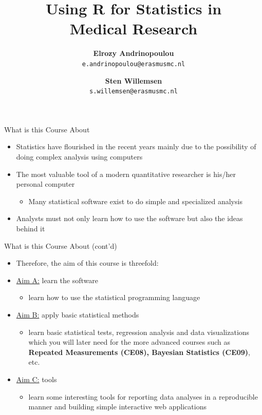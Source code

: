 \documentclass[14pt, aspectratio=169, sectionpage=simple, xclolor=table]{beamer}
\title{Using R for Statistics in \\ Medical Research}
\author{{\large \textbf{Elrozy Andrinopoulou}}\\
	\small{\texttt{e.andrinopoulou@erasmusmc.nl}} \vspace*{1ex} \\
	\and 
{\large 	\textbf{Sten Willemsen}}\\
	\small{\texttt{s.willemsen@erasmusmc.nl}}}
\institute{Department of Biostatistics, Erasmus University Medical Center}
\begin{document}



\begin{titleframe}
\end{titleframe}

\begin{frame}{What is this Course About}
\begin{itemize}
	\item Statistics have flourished in the recent years mainly
	due to the possibility of doing complex analysis using computers
	\nl
	\item The most valuable tool of a modern quantitative researcher
	is his/her personal computer
	\begin{itemize}
		\item Many statistical software exist to do simple and specialized
		analysis
	\end{itemize}
\nl
	\item Analysts must not only learn how to use the software
	but also the ideas behind it
\end{itemize}
\end{frame}
\begin{frame}{What is this Course About (cont'd)}
\begin{itemize}
	\item Therefore, the aim of this course is threefold:
	\item \underline{Aim A:} learn the software
	\begin{itemize}
		\item learn how to use the statistical programming language 
	\end{itemize}
	\item \underline{Aim B:} apply basic statistical methods 
	\begin{itemize}
		\item learn basic statistical tests, regression analysis and data visualizations which you
		will later need for the more advanced courses such as
		\textbf{Repeated Measurements (CE08), Bayesian Statistics (CE09)}, etc.
	\end{itemize}
	\item \underline{Aim C:} tools
	\begin{itemize}
		\item learn some interesting tools for reporting data analyses in a reproducible manner and building simple interactive web applications
	\end{itemize}
\end{itemize}
\end{frame}
\end{document}
